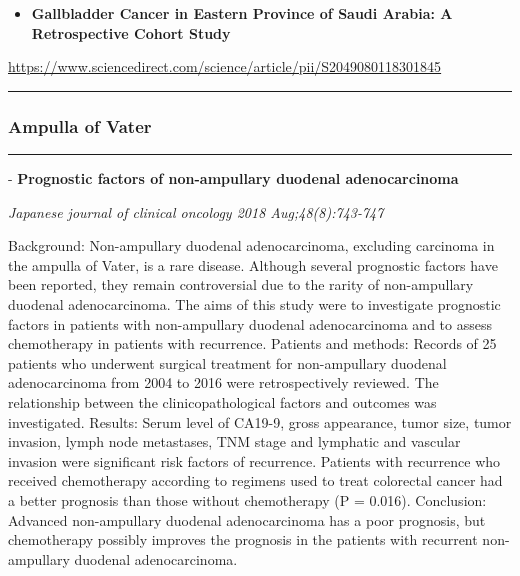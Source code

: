 \documentclass[]{article}
\providecommand{\tightlist}{%
  \setlength{\itemsep}{0pt}\setlength{\parskip}{0pt}}
\begin{document}
\begin{itemize}
\tightlist
\item
  \textbf{Gallbladder Cancer in Eastern Province of Saudi Arabia: A
  Retrospective Cohort Study}
\end{itemize}

\url{https://www.sciencedirect.com/science/article/pii/S2049080118301845}

\begin{center}\rule{0.5\linewidth}{\linethickness}\end{center}

\hypertarget{ampulla-of-vater-1}{%
\subsubsection{Ampulla of Vater}\label{ampulla-of-vater-1}}

\begin{center}\rule{0.5\linewidth}{\linethickness}\end{center}

 - \textbf{Prognostic factors of non-ampullary duodenal adenocarcinoma}

\emph{Japanese journal of clinical oncology 2018 Aug;48(8):743-747}

Background: Non-ampullary duodenal adenocarcinoma, excluding carcinoma
in the ampulla of Vater, is a rare disease. Although several prognostic
factors have been reported, they remain controversial due to the rarity
of non-ampullary duodenal adenocarcinoma. The aims of this study were to
investigate prognostic factors in patients with non-ampullary duodenal
adenocarcinoma and to assess chemotherapy in patients with recurrence.
Patients and methods: Records of 25 patients who underwent surgical
treatment for non-ampullary duodenal adenocarcinoma from 2004 to 2016
were retrospectively reviewed. The relationship between the
clinicopathological factors and outcomes was investigated. Results:
Serum level of CA19-9, gross appearance, tumor size, tumor invasion,
lymph node metastases, TNM stage and lymphatic and vascular invasion
were significant risk factors of recurrence. Patients with recurrence
who received chemotherapy according to regimens used to treat colorectal
cancer had a better prognosis than those without chemotherapy (P =
0.016). Conclusion: Advanced non-ampullary duodenal adenocarcinoma has a
poor prognosis, but chemotherapy possibly improves the prognosis in the
patients with recurrent non-ampullary duodenal adenocarcinoma.
\end{document}
